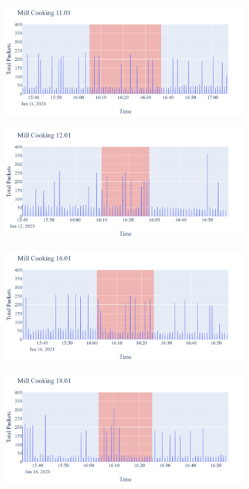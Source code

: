 \begin{figure}[H]
\begin{subfigure}[b]{0.47\textwidth}
        \centering
        \includegraphics[width=1.2\hsize]{figures/Mill_Cooking_Packets_11.01.png}
    \end{subfigure}
    \begin{subfigure}[b]{0.47\textwidth}
        \centering
        \includegraphics[width=1.2\hsize]{figures/Mill_Cooking_Packets_12.01.png}
    \end{subfigure}
    \begin{subfigure}[b]{0.47\textwidth}
        \centering
        \includegraphics[width=1.2\hsize]{figures/Mill_Cooking_Packets_16.01.png}
    \end{subfigure}
    \begin{subfigure}[b]{0.47\textwidth}
        \centering
        \includegraphics[width=1.2\hsize]{figures/Mill_Cooking_Packets_18.01.png}

\end{subfigure}
\end{figure}

